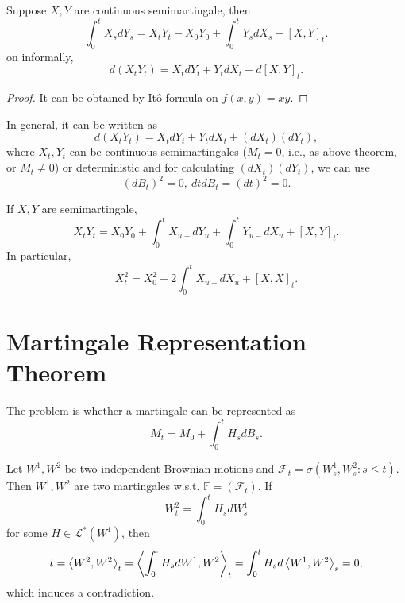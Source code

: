 \begin{thm}
    Suppose $X,Y$ are continuous semimartingale, then
    \begin{equation*}
        \int_0^tX_s dY_s = X_tY_t - X_0Y_0 + \int_0^tY_sdX_s - [X,Y]_t.
    \end{equation*}
    on informally,
    \begin{equation*}
        d(X_tY_t) = X_tdY_t + Y_tdX_t + d[X,Y]_t.
    \end{equation*}
\end{thm}
\begin{proof}
    It can be obtained by It\^o formula on $f(x,y) = xy$.
\end{proof}
\begin{rmk}
    In general, it can be written as
    \begin{equation*}
        d(X_tY_t) = X_tdY_t + Y_tdX_t + (dX_t)(dY_t),
    \end{equation*}
    where $X_t,Y_t$ can be continuous semimartingales ($M_t = 0$, i.e., as above theorem, or $M_t \neq 0$) or deterministic and for calculating $(dX_t)(dY_t)$, we can use
    \begin{equation*}
        (dB_t)^2 = 0,~dtdB_t = (dt)^2 = 0.
    \end{equation*}
\end{rmk}
\begin{rmk}
    If $X,Y$ are semimartingale,
    \begin{equation*}
        X_tY_t = X_0Y_0 + \int_0^tX_{u-}dY_u +  \int_0^t Y_{u-}dX_u + [X,Y]_t.
    \end{equation*}
    In particular,
    \begin{equation*}
        X_t^2 = X_0^2 + 2\int_0^t X_{u-}dX_u + [X,X]_t.
    \end{equation*}
\end{rmk}

\section{Martingale Representation Theorem}

The problem is whether a martingale can be represented as
\begin{equation*}
    M_t = M_0 + \int_0^tH_s dB_s.
\end{equation*}


\begin{exam}
    Let $W^1,W^2$ be two independent Brownian motions and $\mathcal{F}_t =\sigma(W^1_s,W^2_s \colon s\leq t)$. Then $W^1,W^2$ are two martingales w.s.t. $\mathbb{F} = (\mathcal{F}_t)$. If
    \begin{equation*}
        W_t^2 = \int_0^t H_s dW^1_s
    \end{equation*}
    for some $H \in \mathcal{L}^*(W^1)$, then
    \begin{equation*}
        t = \left\langle W^2,W^2 \right\rangle_t = \left\langle \int_0^\cdot H_sdW^1,W^2 \right\rangle_t = \int_0^t H_s d\left\langle W^1,W^2 \right\rangle_s = 0,
    \end{equation*}
    which induces a contradiction.
\end{exam}


